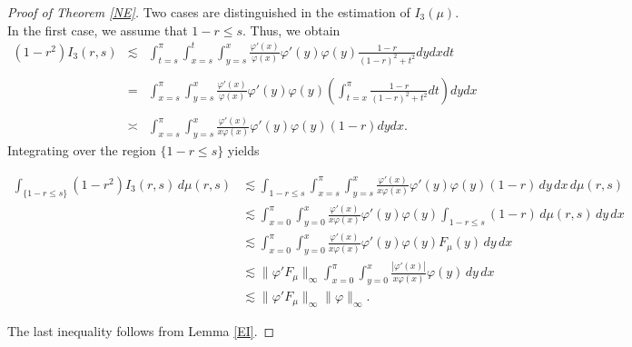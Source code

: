 \documentclass[12pt,reqno,a4paper]{amsart}
\numberwithin{equation}{section}
\begin{document}
\begin{proof}[Proof of Theorem \ref{NE}]
		Two cases are distinguished in the estimation of $I_3(\mu)$. In the first case, we assume that $1 - r \leq s$. Thus, we obtain  
		\[
		\begin{array}{lll}
			(1-r^2)I_3(r,s) & \lesssim & \displaystyle \int _{t=s}^{ \pi} \displaystyle \int _{x =s}^t   \displaystyle \int _{y=s}^x\frac{\varphi'(x)}{\varphi(x)}\varphi'(y)\varphi(y)\frac{1-r}{(1-r)^2+t^2}dydxdt\\
			\\
			& = & \displaystyle \int _{x =s}^{ \pi}   \displaystyle \int _{y=s}^x\frac{\varphi'(x)}{\varphi(x)}\varphi'(y)\varphi(y) \left (\displaystyle \int _{t=x}^{\pi} \frac{1-r}{(1-r)^2+t^2}dt\right )dydx\\
			\\
			&\asymp & \displaystyle \int _{x =s}^{ \pi}   \displaystyle \int _{y=s}^x\frac{\varphi'(x)}{x\varphi(x)}\varphi'(y)\varphi(y)(1-r)dydx.
		\end{array}
		\]
		Integrating over the region $\{1-r\leq s\}$ yields
		\begin{small}{
				\[
				\begin{aligned}
					\int_{\{1-r\le s\}} (1-r^2) I_3(r,s)\, d\mu(r,s)
					&\lesssim
					\int_{1-r\le s}
					\int_{x=s}^{\pi}\int_{y=s}^{x}
					\frac{\varphi'(x)}{x\varphi(x)}\varphi'(y)\varphi(y)(1-r)
					\,dy\,dx\,d\mu(r,s) \\
					&\lesssim
					\int_{x=0}^{\pi}\int_{y=0}^{x}
					\frac{\varphi'(x)}{x\varphi(x)}\varphi'(y)\varphi(y)\int_{1-r\le s}
					(1-r)\,d\mu(r,s) 
					\,dy\,dx\\
					&\lesssim
					\int_{x=0}^{\pi}\int_{y=0}^{x}
					\frac{\varphi'(x)}{x\varphi(x)}\varphi'(y)\varphi(y)
					F_\mu(y)\,dy\,dx \\
					&\lesssim
					\|\varphi' F_\mu\|_\infty
					\int_{x=0}^{\pi}\int_{y=0}^{x}
					\frac{|\varphi'(x)|}{x\varphi(x)}\varphi(y)\,dy\,dx \\
					&\lesssim
					\|\varphi' F_\mu\|_\infty \|\varphi\|_\infty .
				\end{aligned}
				\]}\end{small}
		The last inequality follows from Lemma \ref{EI}.
		

\end{proof}
\end{document}
